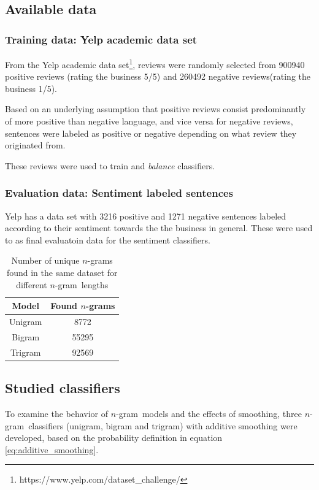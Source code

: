 \documentclass[a4paper,11pt]{kth-mag}
\newcommand{\ngram}{$n$-gram}
\begin{document}
\subsection{Available data}

\subsubsection{Training data: Yelp academic data set}
From the Yelp academic data set\footnote{https://www.yelp.com/dataset\_challenge/},
reviews were randomly selected from 900940 positive reviews (rating the business 5/5)
and 260492 negative reviews(rating the business 1/5).%

Based on an underlying assumption that positive reviews consist predominantly of more
positive than negative language, and vice versa for negative reviews,
sentences were labeled as positive or negative depending on what review they originated from.

These reviews were used to train and \emph{balance} classifiers.

\subsubsection{Evaluation data: Sentiment labeled sentences}
Yelp has a data set with 3216 positive and 1271 negative sentences labeled
according to their sentiment towards the the business in general.
These were used to as final evaluatoin data for the sentiment classifiers.

\vspace{2cm}
\begin{table}[h]
  \centering
  \begin{tabular}{| c | c |}
    \hline
    \textbf{Model} & \textbf{Found \ngram s}\\ \hline
    Unigram&8772\\
    Bigram&55295\\
    Trigram&92569\\
    \hline
  \end{tabular}
  \caption{Number of unique \ngram s found in the same dataset for different \ngram~lengths}
  \label{tab:found_ngrams}
\end{table}

\pagebreak


\subsection{Studied classifiers}
To examine the behavior of \ngram~models and the effects of smoothing,
three \ngram~classifiers (unigram, bigram and trigram) with additive smoothing
were developed, based on the probability definition in equation \ref{eq:additive_smoothing}.
\end{document}
